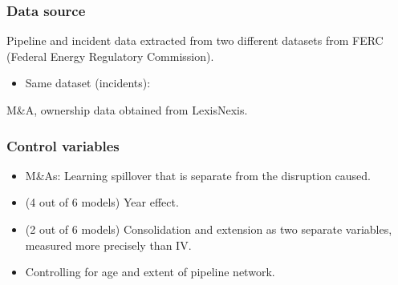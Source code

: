 \begin{frame}
	\frametitle{Data source}
	Pipeline and incident data extracted from two different datasets from FERC (Federal Energy Regulatory Commission).
	\begin{itemize}
		\item Same dataset (incidents): \citet{Park2019}
	\end{itemize}
	M\&A, ownership data obtained from LexisNexis.
\end{frame}

\begin{frame}
	\frametitle{Control variables}
	\begin{itemize}
		\item M\&As: Learning spillover that is separate from the disruption caused.
		\item (4 out of 6 models) Year effect.
		\item (2 out of 6 models) Consolidation and extension as two separate variables, measured more precisely than IV.
		\item Controlling for age and extent of pipeline network.
	\end{itemize}
\end{frame}